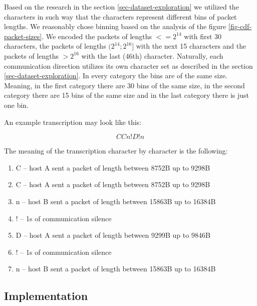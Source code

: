 \documentclass{article}
\begin{document}
Based on the research in the section \ref{sec-dataset-exploration} we utilized the characters in such way that the characters represent different bins of packet lengths. We reasonably chose binning based on the analysis of the figure \ref{fig-cdf-packet-sizes}. We encoded the packets of lengths $<= 2^{14}$ with first 30 characters, the packets of lengths $(2^{14}; 2^{16}]$ with the next 15 characters and the packets of lengths $> 2^{16}$ with the last (46th) character. Naturally, each communication direction utilizes its own character set as described in the section \ref{sec-dataset-exploration}. In every category the bins are of the same size. Meaning, in the first category there are 30 bins of the same size, in the second category there are 15 bins of the same size and in the last category there is just one bin.

\noindent An example transcription may look like this:

$$ CCn!D!n $$

\noindent The meaning of the transcription character by character is the following:

\begin{enumerate}
    \item C -- host A sent a packet of length between 8752B up to 9298B
    \item C -- host A sent a packet of length between 8752B up to 9298B
    \item n -- host B sent a packet of length between 15863B up to 16384B
    \item ! -- 1s of communication silence
    \item D -- host A sent a packet of length between 9299B up to 9846B
    \item ! -- 1s of communication silence
    \item n -- host B sent a packet of length between 15863B up to 16384B
\end{enumerate}






\subsection{Implementation}
\end{document}
